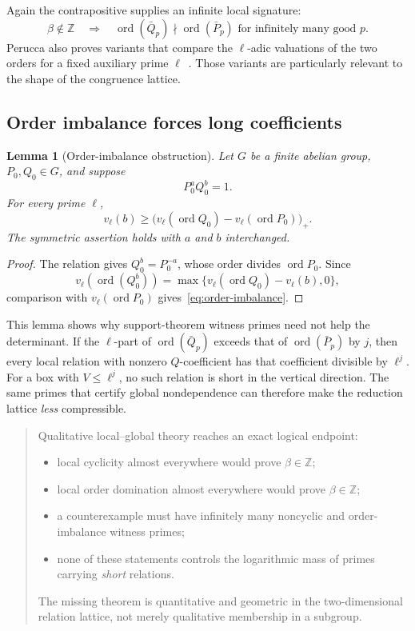 \documentclass[11pt]{article}
\newtheorem{lemma}[theorem]{Lemma}
\theoremstyle{definition}
\theoremstyle{remark}
\newcommand{\Z}{\mathbb Z}
\newcommand{\ord}{\operatorname{ord}}
\newenvironment{resultbox}{\begin{quote}\small}{\end{quote}}
\begin{document}
Again the contrapositive supplies an infinite local signature:
\begin{equation}
 \beta\notin\Z
 \quad\Longrightarrow\quad
 \ord(\bar Q_p)\nmid\ord(\bar P_p)
 \text{ for infinitely many good }p.
 \label{eq:order-witnesses}
\end{equation}
Perucca also proves variants that compare the $\ell$-adic valuations of the two orders for a fixed auxiliary prime $\ell$~\cite{PeruccaSupport}.  Those variants are particularly relevant to the shape of the congruence lattice.

\subsection{Order imbalance forces long coefficients}

\begin{lemma}[Order-imbalance obstruction]
\label{lem:order-imbalance}
Let $G$ be a finite abelian group, $P_0,Q_0\in G$, and suppose
\[
 P_0^aQ_0^b=1.
\]
For every prime $\ell$,
\begin{equation}
 v_\ell(b)\ge
 \bigl(v_\ell(\ord Q_0)-v_\ell(\ord P_0)\bigr)_+.
 \label{eq:order-imbalance}
\end{equation}
The symmetric assertion holds with $a$ and $b$ interchanged.
\end{lemma}

\begin{proof}
The relation gives $Q_0^b=P_0^{-a}$, whose order divides $\ord P_0$.  Since
\[
 v_\ell(\ord(Q_0^b))
 =\max\{v_\ell(\ord Q_0)-v_\ell(b),0\},
\]
comparison with $v_\ell(\ord P_0)$ gives~\eqref{eq:order-imbalance}.
\end{proof}

This lemma shows why support-theorem witness primes need not help the determinant.  If the $\ell$-part of $\ord(\bar Q_p)$ exceeds that of $\ord(\bar P_p)$ by $j$, then every local relation with nonzero $Q$-coefficient has that coefficient divisible by $\ell^j$.  For a box with $V\le\ell^j$, no such relation is short in the vertical direction.  The same primes that certify global nondependence can therefore make the reduction lattice \emph{less} compressible.

\begin{resultbox}
Qualitative local--global theory reaches an exact logical endpoint:
\begin{itemize}
\item local cyclicity almost everywhere would prove $\beta\in\Z$;
\item local order domination almost everywhere would prove $\beta\in\Z$;
\item a counterexample must have infinitely many noncyclic and order-imbalance witness primes;
\item none of these statements controls the logarithmic mass of primes carrying \emph{short} relations.
\end{itemize}
The missing theorem is quantitative and geometric in the two-dimensional relation lattice, not merely qualitative membership in a subgroup.
\end{resultbox}
\end{document}
